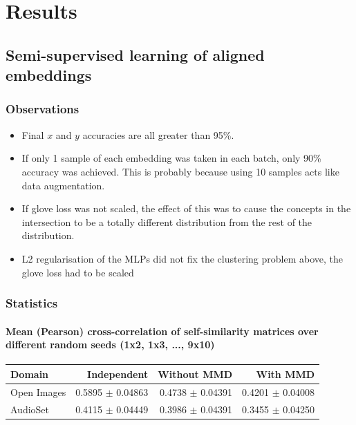 \chapter{Results}


\section{Semi-supervised learning of aligned embeddings}

\subsection{Observations}

\begin{itemize}
    \item Final $x$ and $y$ accuracies are all greater than 95\%.
    \item If only 1 sample of each embedding was taken in each batch, only 90\% accuracy was achieved. This is probably because using 10 samples acts like data augmentation. 
    \item If glove loss was not scaled, the effect of this was to cause the concepts in the intersection to be a totally different distribution from the rest of the distribution.
    \item L2 regularisation of the MLPs did not fix the clustering problem above, the glove loss had to be scaled
\end{itemize}

\subsection{Statistics}

\subsubsection{Mean (Pearson) cross-correlation of self-similarity matrices over different random seeds (1x2, 1x3, ..., 9x10)}
\begin{tabular}{lrrr}
\toprule
Domain &   Independent & Without MMD &  With MMD \\
\midrule
Open Images    & 0.5895 $\pm$ 0.04863 & 0.4738 $\pm$ 0.04391 &     0.4201 $\pm$  0.04008 \\
AudioSet    & 0.4115 $\pm$ 0.04449 &  0.3986 $\pm$ 0.04391  &      0.3455  $\pm$ 0.04250  \\
\bottomrule
\end{tabular}\\

